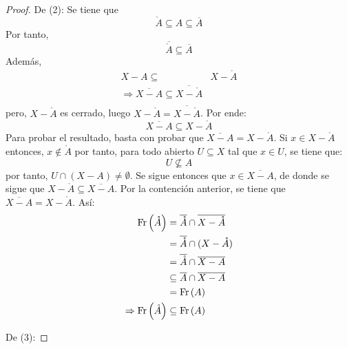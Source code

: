 \documentclass[12pt]{report}
\theoremstyle{largebreak}
\newcommand{\Int}[1]{\ensuremath{\mathring{#1}}}
\newcommand{\Cls}[1]{\ensuremath{\overline{#1}}}
\newcommand{\Fr}[1]{\ensuremath{\textup{Fr}\left(#1\right)}}
\begin{document}
\begin{proof}
        De (2): Se tiene que
        \begin{equation*}
            \Int{A}\subseteq A\subseteq \Cls{A}
        \end{equation*}
        Por tanto,
        \begin{equation*}
            \Cls{\Int{A}}\subseteq\Cls{A}
        \end{equation*}
        Además,
        \begin{equation*}
            \begin{split}
                X-A\subseteq& X-\Int{A}\\
                \Rightarrow\Cls{X-A}\subseteq\Cls{X-\Int{A}}\\
            \end{split}
        \end{equation*}
        pero, $X-\Int{A}$ es cerrado, luego $X-\Int{A}=\Cls{X-\Int{A}}$. Por ende:
        \begin{equation*}
            \Cls{X-A}\subseteq X-\Int{A}
        \end{equation*}
        Para probar el resultado, basta con probar que $\Cls{X-A}=X-\Int{A}$. Si $x\in X-\Int{A}$ entonces, $x\notin\Int{A}$ por tanto, para todo abierto $U\subseteq X$ tal que $x\in U$, se tiene que:
        \begin{equation*}
            U\nsubseteq A
        \end{equation*}
        por tanto, $U\cap (X-A)\neq\emptyset$. Se sigue entonces que $x\in \Cls{X-A}$, de donde se sigue que $X-\Int{A}\subseteq\Cls{X-A}$. Por la contención anterior, se tiene que $\Cls{X-A}=X-\Int{A}$. Así:
        \begin{equation*}
            \begin{split}
                \Fr{\Int{A}}&=\Cls{\Int{A}}\cap\Cls{X-\Int{A}}\\
                &=\Cls{\Int{A}}\cap(X-\Int{A})\\
                &=\Cls{\Int{A}}\cap\Cls{X-A} \\
                &\subseteq\Cls{A}\cap\Cls{X-A} \\
                &=\Fr{A}\\
                \Rightarrow \Fr{\Int{A}}&\subseteq\Fr{A}\\
            \end{split}
        \end{equation*}

        De (3): 

    \end{proof}
\end{document}
